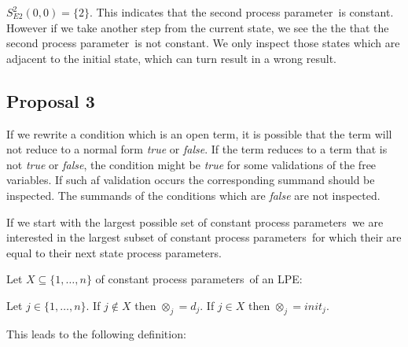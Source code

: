 \documentclass[a4paper,10pt]{article}
\newcommand{\ovr}{\overrightarrow}
\newcommand{\pp}{process parameter}
\newcommand{\pps}{process parameters}
\newcommand{\ti}{\textit}
\begin{document}
\begin{defn}
$S_{E2}^2(0,0) = \lbrace 2 \rbrace$. This indicates that the second \pp\ is constant. However if we take another step from the current state, we see the the that the second \pp\ is not constant. We only inspect those states which are adjacent to the initial state, which can turn result in a wrong result.
\end{defn}

\subsection{Proposal 3}
If we rewrite a condition which is an open term, it is possible
that the term will not reduce to a normal form \ti{true} or \ti{false}. If the term reduces to a
term that is not \ti{true} or \ti{false}, the condition might be \ti{true} for some validations of the free variables. If such af validation occurs the corresponding summand should be inspected. The summands of the conditions which are \ti{false} are not inspected. 

If we start with the largest possible set of constant \pps\ we are interested in the largest subset of constant \pps\ for which their are equal to their next state \pps.

Let $X \subseteq \lbrace 1, \ldots, n \rbrace$ of constant \pps\ of an LPE:

\begin{defn} [We define $\ovr{\otimes_X}$]
Let $j \in \lbrace 1, \dots, n \rbrace $. 
If $j \not\in X$ then $\otimes_j = d_j$. 
If $j \in X$ then $\otimes_j = init_j$.
\end{defn}

 
This leads to the following definition: 
\end{document}

